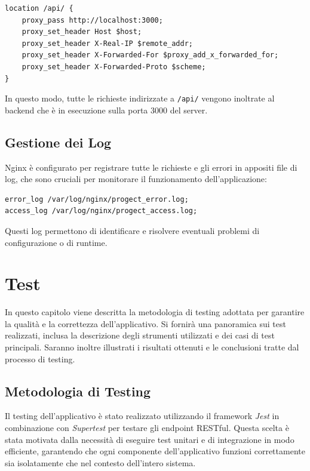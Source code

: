 \documentclass[twoside]{supsistudent}
\begin{document}
\begin{verbatim}
location /api/ {
    proxy_pass http://localhost:3000;
    proxy_set_header Host $host;
    proxy_set_header X-Real-IP $remote_addr;
    proxy_set_header X-Forwarded-For $proxy_add_x_forwarded_for;
    proxy_set_header X-Forwarded-Proto $scheme;
}
\end{verbatim}

In questo modo, tutte le richieste indirizzate a \texttt{/api/} vengono inoltrate al backend che è in esecuzione sulla porta 3000 del server.

\section{Gestione dei Log}

Nginx è configurato per registrare tutte le richieste e gli errori in appositi file di log, che sono cruciali per monitorare il funzionamento dell'applicazione:

\begin{verbatim}
error_log /var/log/nginx/progect_error.log;
access_log /var/log/nginx/progect_access.log;
\end{verbatim}

Questi log permettono di identificare e risolvere eventuali problemi di configurazione o di runtime.



\chapter{Test}

In questo capitolo viene descritta la metodologia di testing adottata per garantire la qualità e la correttezza dell'applicativo. Si fornirà una panoramica sui test realizzati, inclusa la descrizione degli strumenti utilizzati e dei casi di test principali. Saranno inoltre illustrati i risultati ottenuti e le conclusioni tratte dal processo di testing.

\section{Metodologia di Testing}

Il testing dell'applicativo è stato realizzato utilizzando il framework \textit{Jest} in combinazione con \textit{Supertest} per testare gli endpoint RESTful. Questa scelta è stata motivata dalla necessità di eseguire test unitari e di integrazione in modo efficiente, garantendo che ogni componente dell'applicativo funzioni correttamente sia isolatamente che nel contesto dell'intero sistema.
\end{document}
